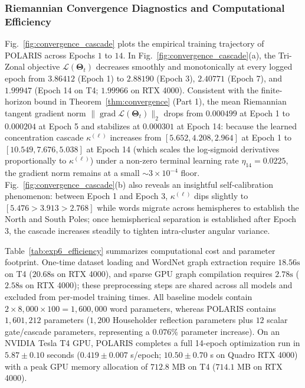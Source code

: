 \documentclass[journal]{IEEEtran}
\begin{document}
\subsubsection{Riemannian Convergence Diagnostics and Computational Efficiency}
Fig.~\ref{fig:convergence_cascade} plots the empirical training trajectory of POLARIS across Epochs $1$ to $14$. In Fig.~\ref{fig:convergence_cascade}(a), the Tri-Zonal objective $\mathcal{L}(\boldsymbol{\Theta}_t)$ decreases smoothly and monotonically at every logged epoch from $3.86412$ (Epoch 1) to $2.88190$ (Epoch 3), $2.40771$ (Epoch 7), and $1.99947$ (Epoch 14 on T4; $1.99966$ on RTX 4000). Consistent with the finite-horizon bound in Theorem~\ref{thm:convergence} (Part 1), the mean Riemannian tangent gradient norm $\|\operatorname{grad}\mathcal{L}(\boldsymbol{\Theta}_t)\|_2$ drops from $0.000499$ at Epoch 1 to $0.000204$ at Epoch 5 and stabilizes at $0.000301$ at Epoch 14: because the learned concentration cascade $\kappa^{(\ell)}$ increases from $[5.652, 4.208, 2.964]$ at Epoch 1 to $[10.549, 7.676, 5.038]$ at Epoch 14 (which scales the log-sigmoid derivatives proportionally to $\kappa^{(\ell)}$) under a non-zero terminal learning rate $\eta_{14} = 0.0225$, the gradient norm remains at a small $\sim 3 \times 10^{-4}$ floor. Fig.~\ref{fig:convergence_cascade}(b) also reveals an insightful self-calibration phenomenon: between Epoch 1 and Epoch 3, $\kappa^{(\ell)}$ dips slightly to $[5.476 > 3.913 > 2.768]$ while words migrate across hemispheres to establish the North and South Poles; once hemispherical separation is established after Epoch 3, the cascade increases steadily to tighten intra-cluster angular variance.

Table~\ref{tab:exp6_efficiency} summarizes computational cost and parameter footprint. One-time dataset loading and WordNet graph extraction require $18.56\text{s}$ on T4 ($20.68\text{s}$ on RTX 4000), and sparse GPU graph compilation requires $2.78\text{s}$ ($2.58\text{s}$ on RTX 4000); these preprocessing steps are shared across all models and excluded from per-model training times. All baseline models contain $2 \times 8,000 \times 100 = 1,600,000$ word parameters, whereas POLARIS contains $1,601,212$ parameters ($1,200$ Householder reflection parameters plus $12$ scalar gate/cascade parameters, representing a $0.076\%$ parameter increase). On an NVIDIA Tesla T4 GPU, POLARIS completes a full 14-epoch optimization run in $5.87 \pm 0.10$ seconds ($0.419 \pm 0.007$ s/epoch; $10.50 \pm 0.70$ s on Quadro RTX 4000) with a peak GPU memory allocation of $712.8$ MB on T4 ($714.1$ MB on RTX 4000).
\end{document}
